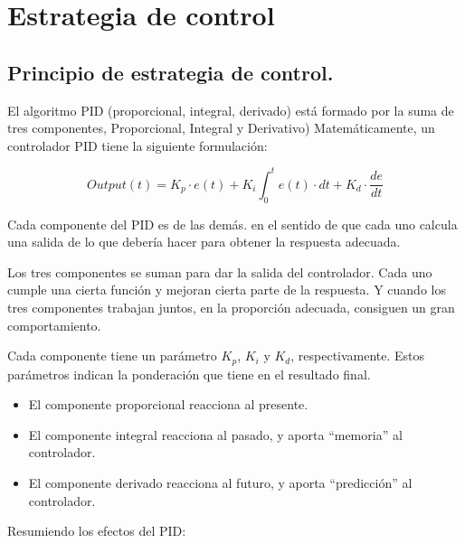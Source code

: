 \chapter{Estrategia de control}

\label{C:Formas de control}

\section{Principio de estrategia de control.}
El algoritmo PID (proporcional, integral, derivado) está formado por la suma de tres componentes, Proporcional, Integral y Derivativo) Matemáticamente, un controlador PID tiene la siguiente formulación: \par
\begin{equation}
Output(t)=K_p\cdot e(t)+K_i\int_0^t e(t)\cdot dt+K_d\cdot \frac{de}{dt}
\end{equation} \par 
Cada componente del PID es  de las demás. en el sentido de que cada uno calcula una salida de lo que  debería hacer para obtener la respuesta adecuada. \par 
Los tres componentes se suman para dar la salida del controlador. Cada uno cumple una cierta función y mejoran cierta parte de la respuesta. Y cuando los tres componentes trabajan juntos, en la proporción adecuada, consiguen un gran comportamiento. \par 
Cada componente tiene un parámetro $K_p$, $K_i$ y $K_d$, respectivamente. Estos parámetros indican la ponderación que tiene en el resultado final.
\begin{itemize}
\item El componente proporcional reacciona al presente.
\item El componente integral reacciona al pasado, y aporta “memoria” al controlador.
\item El componente derivado reacciona al futuro, y aporta “predicción” al controlador.
\end{itemize} \par 
Resumiendo los efectos del PID:
